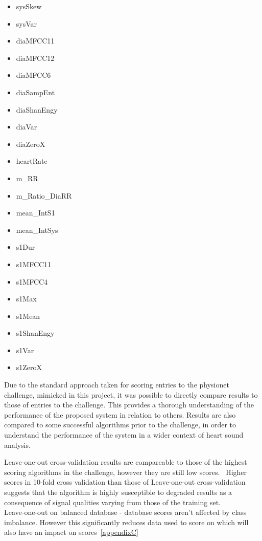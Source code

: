 \documentclass[titlepage, 12pt]{scrartcl} \usepackage{enumitem}
\begin{document}
\begin{table}[H]
\begin{multicols}{5}
\begin{itemize}
    \item sysSkew
    \item sysVar
    \item diaMFCC11
    \item diaMFCC12
    \item diaMFCC6
    \item diaSampEnt
    \item diaShanEngy
    \item diaVar
    \item diaZeroX
    \item heartRate
    \item m\_RR
    \item m\_Ratio\_DiaRR
    \item mean\_IntS1
    \item mean\_IntSys
    \item s1Dur
    \item s1MFCC11
    \item s1MFCC4
    \item s1Max
    \item s1Mean
    \item s1ShanEngy
    \item s1Var
    \item s1ZeroX
\end{itemize}
\end{multicols}
\end{table}

Due to the standard approach taken for scoring entries to the physionet
challenge, mimicked in this project, it was possible to directly compare results
to those of entries to the challenge. This provides a thorough understanding of
the performance of the proposed system in relation to others. Results are also
compared to some successful algorithms prior to the challenge, in order to
understand the performance of the system in a wider context of heart sound
analysis.

Leave-one-out cross-validation results are compareable to those of the highest
scoring algorithms in the challenge, however they are still low
scores.~\parencite{Homsi2017, Bobillo2016} Higher scores in 10-fold cross
validation than those of Leave-one-out cross-validation suggests that the
algorithm is highly susceptible to degraded results as a consequence of signal
qualities varying from those of the training set.\\
Leave-one-out on balanced database - database scores aren't affected by class
imbalance. However this significantly reduces data used to score on which will
also have an impact on scores~\ref{appendixC}
\end{document}
